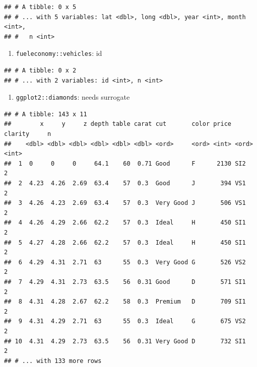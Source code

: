 \documentclass[]{book}
\newenvironment{Shaded}{\begin{snugshade}}{\end{snugshade}}
\newcommand{\DecValTok}[1]{\textcolor[rgb]{0.00,0.00,0.81}{#1}}
\newcommand{\KeywordTok}[1]{\textcolor[rgb]{0.13,0.29,0.53}{\textbf{#1}}}
\newcommand{\NormalTok}[1]{#1}
\newcommand{\OperatorTok}[1]{\textcolor[rgb]{0.81,0.36,0.00}{\textbf{#1}}}
\newcommand{\StringTok}[1]{\textcolor[rgb]{0.31,0.60,0.02}{#1}}
\providecommand{\tightlist}{%
  \setlength{\itemsep}{0pt}\setlength{\parskip}{0pt}}
\theoremstyle{definition}
\theoremstyle{definition}
\theoremstyle{definition}
\theoremstyle{remark}
\begin{document}
\begin{enumerate}
\begin{verbatim}
## # A tibble: 0 x 5
## # ... with 5 variables: lat <dbl>, long <dbl>, year <int>, month <int>,
## #   n <int>
\end{verbatim}

  \begin{enumerate}
  \def\labelenumii{\arabic{enumii}.}
  \tightlist
  \item
    \texttt{fueleconomy::vehicles}: id
  \end{enumerate}

\begin{Shaded}
\end{Shaded}

\begin{verbatim}
## # A tibble: 0 x 2
## # ... with 2 variables: id <int>, n <int>
\end{verbatim}

  \begin{enumerate}
  \def\labelenumii{\arabic{enumii}.}
  \tightlist
  \item
    \texttt{ggplot2::diamonds}: needs surrogate
  \end{enumerate}

\begin{Shaded}
\end{Shaded}

\begin{verbatim}
## # A tibble: 143 x 11
##        x     y     z depth table carat cut       color price clarity     n
##    <dbl> <dbl> <dbl> <dbl> <dbl> <dbl> <ord>     <ord> <int> <ord>   <int>
##  1  0     0     0     64.1    60  0.71 Good      F      2130 SI2         2
##  2  4.23  4.26  2.69  63.4    57  0.3  Good      J       394 VS1         2
##  3  4.26  4.23  2.69  63.4    57  0.3  Very Good J       506 VS1         2
##  4  4.26  4.29  2.66  62.2    57  0.3  Ideal     H       450 SI1         2
##  5  4.27  4.28  2.66  62.2    57  0.3  Ideal     H       450 SI1         2
##  6  4.29  4.31  2.71  63      55  0.3  Very Good G       526 VS2         2
##  7  4.29  4.31  2.73  63.5    56  0.31 Good      D       571 SI1         2
##  8  4.31  4.28  2.67  62.2    58  0.3  Premium   D       709 SI1         2
##  9  4.31  4.29  2.71  63      55  0.3  Ideal     G       675 VS2         2
## 10  4.31  4.29  2.73  63.5    56  0.31 Very Good D       732 SI1         2
## # ... with 133 more rows
\end{verbatim}


\end{enumerate}
\end{document}
